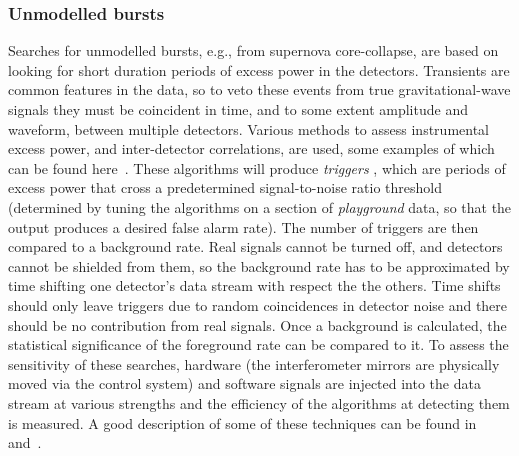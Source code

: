 \subsubsection{Unmodelled bursts}
\label{subsubsection:unmodelled} 

Searches for unmodelled bursts, e.g., from supernova core-collapse, are based on
looking for short duration periods of excess power in the detectors. Transients
are common features in the data, so to veto these events from true gravitational-wave signals they must be coincident in time, and to some extent amplitude and
waveform, between multiple detectors. Various methods to assess instrumental
excess power, and inter-detector correlations, are used, some examples of which
can be found here~\cite{Klimenko:2004, Anderson:2001, Searle:2008, McNabb:2004,
Cadonati:2004, Chatterji:2004, Chatterji:2006}. These algorithms will produce
\textit{triggers} , which are periods of excess power that cross a predetermined
signal-to-noise ratio threshold (determined by tuning the algorithms on a
section of \textit{playground} data, so that the output produces a desired false
alarm rate). The number of triggers are then compared to a background rate. Real
signals cannot be turned off, and detectors cannot be shielded from them, so the
background rate has to be approximated by time shifting one detector's data
stream with respect the the others. Time shifts should only leave triggers due
to random coincidences in detector noise and there should be no contribution
from real signals. Once a background is calculated, the statistical significance
of the foreground rate can be compared to it. To assess the sensitivity of these
searches, hardware (the interferometer mirrors are physically moved via the
control system) and software signals are injected into the data stream at
various strengths and the efficiency of the algorithms at detecting them is
measured. A good description of some of these techniques can be found in
\cite{Abbott:2004b} and~\cite{Abbott:2006a}.


